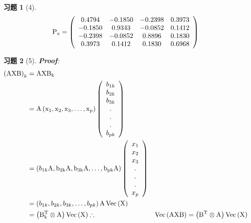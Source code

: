 \documentclass[12pt, oneside]{article}
\newtheorem*{exercise}{\textbf{习题}}
\begin{document}
  \begin{exercise}[4]
	\scriptsize
	\begin{equation*}
	  \rm{
		P_x = \left(
		\begin{array}{cccc}
		  0.4794 & -0.1850 & -0.2398 & 0.3973 \\
		  -0.1850 & 0.9343 & -0.0852 & 0.1412 \\
		  -0.2398 & -0.0852 & 0.8896 & 0.1830 \\
		  0.3973 & 0.1412 & 0.1830 & 0.6968 \\
		\end{array}
		\right)
	  }
	\end{equation*}
  \end{exercise}

  \begin{exercise}[5]
	\rm{
	  \textbf{Proof}:\\
	  \begin{equation*}
		\begin{aligned}
		  \left( \rm{AXB} \right)_k &= \rm{AXB}_k \\
		  &= \rm{A} \left( x_1, x_2, x_3, \dots , x_p \right)
		  \left(
		  \begin{array}{c}
			b_{1k} \\
			b_{2k} \\
			b_{3k} \\
			. \\
			. \\
			. \\
			b_{pk} \\
		  \end{array}
		  \right) \\
		  &= \left( b_{1k}\rm{A}, b_{2k}\rm{A}, b_{3k}\rm{A}, \dots , b_{pk}\rm{A}\right) \left( 
		  \begin{array}{c}
			x_1 \\
			x_2 \\
			x_3 \\
			. \\
			. \\
			. \\
			x_p \\
		  \end{array}
		  \right) \\
		  &= \left( b_{1k}, b_{2k}, b_{3k}, \dots , b_{pk}\right)\rm{A}\operatorname{Vec}\left( \rm{X} \right) \\
		  &= \left( \rm{B}_k^T \otimes \rm{A} \right) \operatorname{Vec} \left( \rm{X} \right) 
	  \therefore& \operatorname{Vec}\left( \rm{AXB} \right)	= \left( \rm{B}^T \otimes \rm{A} \right) \operatorname{Vec} \left( \rm{X} \right)
		\end{aligned} 
	  \end{equation*}
	}
  \end{exercise}
\end{document}
